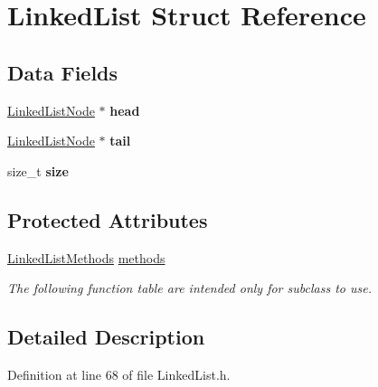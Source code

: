 \hypertarget{structLinkedList}{\section{Linked\-List Struct Reference}
\label{structLinkedList}
}
\subsection*{Data Fields}
\begin{DoxyCompactItemize}
\item 
\hypertarget{structLinkedList_ab0f2e260b7ea9b4259188fa1ed9c855f}{\hyperlink{structLinkedListNode}{Linked\-List\-Node} $\ast$ {\bfseries head}}\label{structLinkedList_ab0f2e260b7ea9b4259188fa1ed9c855f}

\item 
\hypertarget{structLinkedList_ad88e00638ee39ab681869c1ae8b685b2}{\hyperlink{structLinkedListNode}{Linked\-List\-Node} $\ast$ {\bfseries tail}}\label{structLinkedList_ad88e00638ee39ab681869c1ae8b685b2}

\item 
\hypertarget{structLinkedList_a8983298fc229caceaa6435c9c20417dc}{size\-\_\-t {\bfseries size}}\label{structLinkedList_a8983298fc229caceaa6435c9c20417dc}

\end{DoxyCompactItemize}
\subsection*{Protected Attributes}
\begin{DoxyCompactItemize}
\item 
\hyperlink{structLinkedListMethods}{Linked\-List\-Methods} \hyperlink{structLinkedList_ab6cc1736f85c5b6241908fd411d11c4b}{methods}
\begin{DoxyCompactList}\small\item\em The following function table are intended only for subclass to use. \end{DoxyCompactList}\end{DoxyCompactItemize}


\subsection{Detailed Description}


Definition at line 68 of file Linked\-List.\-h.



